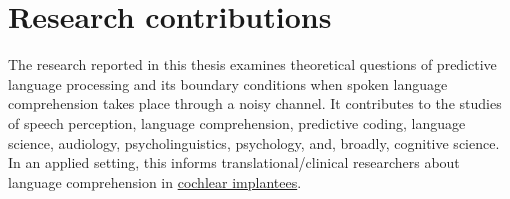 \documentclass[a4paper, nobind]{templates/ociamthesis}
\begin{document}
\hypertarget{research-contributions}{%
\section{Research contributions}\label{research-contributions}}

The research reported in this thesis examines theoretical questions of predictive language processing and its boundary conditions when spoken language comprehension takes place through a noisy channel.
It contributes to the studies of speech perception, language comprehension, predictive coding, language science, audiology, psycholinguistics, psychology, and, broadly, cognitive science.
In an applied setting, this informs translational/clinical researchers about language comprehension in \protect\hyperlink{distortion-degradation}{cochlear implantees}.
\end{document}
